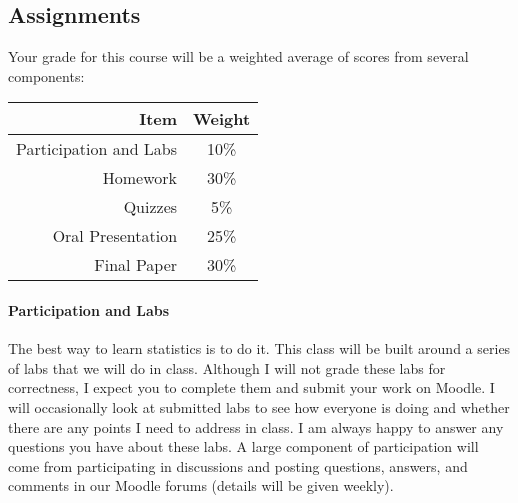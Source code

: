 \documentclass[11pt]{article}
\begin{document}
%

\subsection*{Assignments}

Your grade for this course will be a weighted average of scores from several components:

\begin{table}[!h]
\centering
\begin{tabular}{r c}
\toprule
Item & Weight \\
\midrule
Participation and Labs & 10\% \\
\cmidrule(r){1-2}
Homework & 30\% \\
\cmidrule(r){1-2}
Quizzes & 5\% \\
\cmidrule(r){1-2}
Oral Presentation & 25\%\\
\cmidrule(r){1-2}
Final Paper & 30\% \\
\bottomrule
\end{tabular}
\end{table}

\paragraph{Participation and Labs}
The best way to learn statistics is to do it.  This class will be built around a series of labs that we will do in class.  Although I will not grade these labs for correctness, I expect you to complete them and submit your work on Moodle.  I will occasionally look at submitted labs to see how everyone is doing and whether there are any points I need to address in class.  I am always happy to answer any questions you have about these labs. A large component of participation will come from participating in discussions and posting questions, answers, and comments in our Moodle forums (details will be given weekly).
\end{document}
